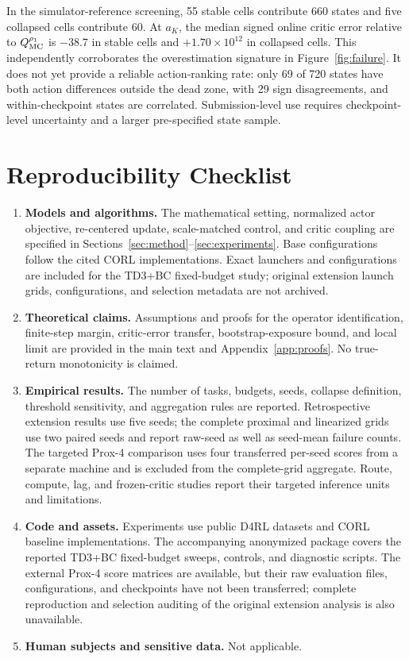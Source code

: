 In the simulator-reference screening, 55 stable cells contribute 660 states
and five collapsed cells contribute 60. At $a_K$, the median signed online
critic error relative to $Q_{\rm MC}^{\rho_1}$ is $-38.7$ in stable cells and
$+1.70\times10^{12}$ in collapsed cells. This independently corroborates
the overestimation signature in Figure~\ref{fig:failure}. It does not yet
provide a reliable action-ranking rate: only 69 of 720 states have both
action differences outside the dead zone, with 29 sign disagreements, and
within-checkpoint states are correlated. Submission-level use requires
checkpoint-level uncertainty and a larger pre-specified state sample.

\section{Reproducibility Checklist}
\label{app:checklist}

\begin{enumerate}
\item \textbf{Models and algorithms.} The mathematical setting, normalized actor objective, re-centered update, scale-matched control, and critic coupling are specified in Sections~\ref{sec:method}--\ref{sec:experiments}. Base configurations follow the cited CORL implementations. Exact launchers and configurations are included for the TD3+BC fixed-budget study; original extension launch grids, configurations, and selection metadata are not archived.
\item \textbf{Theoretical claims.} Assumptions and proofs for the operator identification, finite-step margin, critic-error transfer, bootstrap-exposure bound, and local limit are provided in the main text and Appendix~\ref{app:proofs}. No true-return monotonicity is claimed.
\item \textbf{Empirical results.} The number of tasks, budgets, seeds, collapse definition, threshold sensitivity, and aggregation rules are reported. Retrospective extension results use five seeds; the complete proximal and linearized grids use two paired seeds and report raw-seed as well as seed-mean failure counts. The targeted Prox-4 comparison uses four transferred per-seed scores from a separate machine and is excluded from the complete-grid aggregate. Route, compute, lag, and frozen-critic studies report their targeted inference units and limitations.
\item \textbf{Code and assets.} Experiments use public D4RL datasets and CORL baseline implementations. The accompanying anonymized package covers the reported TD3+BC fixed-budget sweeps, controls, and diagnostic scripts. The external Prox-4 score matrices are available, but their raw evaluation files, configurations, and checkpoints have not been transferred; complete reproduction and selection auditing of the original extension analysis is also unavailable.
\item \textbf{Human subjects and sensitive data.} Not applicable.
\end{enumerate}
